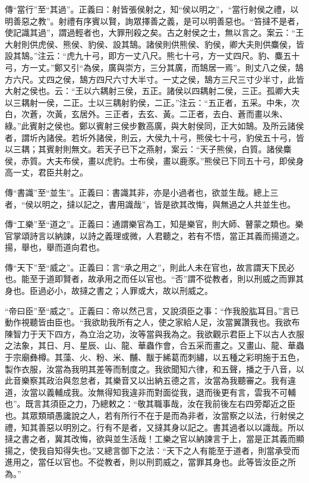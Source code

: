 {\noindent\zhuan{}\fzbyks 傳“當行”至“其過”。正義曰：射皆張侯射之，知“侯以明之”，“當行射侯之禮，以明善惡之教”。射禮有序賓以賢，詢眾擇善之義，是可以明善惡也。“笞撻不是者，使記識其過”，謂過輕者也，大罪刑殺之矣。古之射侯之士，無以言之。案云：“王大射則供虎侯、熊侯、豹侯、設其鵠。諸侯則供熊侯、豹侯，卿大夫則供麋侯，皆設其鵠。”注云：“虎九十弓，即方一丈八尺。熊七十弓，方一丈四尺。豹、麋五十弓，方一丈。”鄭又引“為侯，廣與崇方，三分其廣，而鵠居一焉”。則丈八之侯，鵠方六尺。丈四之侯，鵠方四尺六寸大半寸。一丈之侯，鵠方三尺三寸少半寸，此皆大射之侯也。云：“王以六耦射三侯，五正。諸侯以四耦射二侯，三正。孤卿大夫以三耦射一侯，二正。士以三耦射豹侯，二正。”注云：“五正者，五采。中朱，次白，次蒼，次黃，玄居外。三正者，去玄、黃。二正者，去白、蒼而畫以朱、綠。”此賓射之侯也。鄭以賓射三侯步數高廣，與大射侯同，正大如鵠。及所云諸侯者，謂圻內諸侯。若圻外諸侯，則云，大侯九十弓，熊侯七十弓，豹侯五十弓，皆以三耦；其賓射則無文。若天子已下之燕射，案云：“天子熊侯，白質。諸侯麋侯，赤質。大夫布侯，畫以虎豹。士布侯，畫以鹿豕。”熊侯已下同五十弓，即侯身高一丈，君臣共射之。 \par}

{\noindent\zhuan{}\fzbyks 傳“書識”至“並生”。正義曰：書識其非，亦是小過者也，欲並生哉。總上三者，“侯以明之，撻以記之，書用識哉”，皆是欲其改悔，與無過之人共並生也。 \par}

{\noindent\zhuan{}\fzbyks 傳“工樂”至“道之”。正義曰：通謂樂官為工，知是樂官，則大師、瞽蒙之類也。樂官掌頌詩言以納諫，以詩之義理或微，人君聽之，若有不悟，當正其義而揚道之。揚，舉也，舉而道向君也。 \par}

{\noindent\zhuan{}\fzbyks 傳“天下”至“威之”。正義曰：言“承之用之”，則此人未在官也，故言謂天下民必也。能至于道即賢者，故承用之而任以官也。“否”謂不從教者，則以刑威之而罪其身也。臣過必小，故撻之書之；人罪或大，故以刑威之。 \par}

{\noindent\shu{}\fzkt “帝曰臣”至“威之”。正義曰：帝以然己言，又說須臣之事：“作我股肱耳目。”言已動作視聽皆由臣也。“我欲助我所有之人，使之家給人足，汝當翼讚我也。我欲布陳智力于天下四方，為立治之功，汝等當與我為之。我欲觀示君臣上下以古人衣服之法象，其日、月、星辰、山、龍、華蟲作會，合五采而畫之。又畫山、龍、華蟲于宗廟彝樽。其藻、火、粉、米、黼、黻于絺葛而刺繡，以五種之彩明施于五色，製作衣服，汝當為我明其差等而制度之。我欲聞知六律，和五聲，播之于八音，以此音樂察其政治與忽怠者，其樂音又以出納五德之言，汝當為我聽審之。我有違道，汝當以義輔成我。汝無得知我違非而對面從我，退而後更有言，雲我不可輔也”。既言其須臣之力，乃總敕之：“敬其職事哉，汝在我前後左右四旁鄰近之臣也。其眾類頑愚讒說之人，若有所行不在于是而為非者，汝當察之以法，行射侯之禮，知其善惡以明別之。行有不是者，又撻其身以記之。書其過者以以識哉。所以撻之書之者，冀其改悔，欲與並生活哉！工樂之官以納諫言于上，當是正其義而顯揚之，使我自知得失也。”又總言御下之法：“天下之人有能至于道者，則當承受而進用之，當任以官也。不從教者，則以刑罰威之，當罪其身也。此等皆汝臣之所為。” \par}

